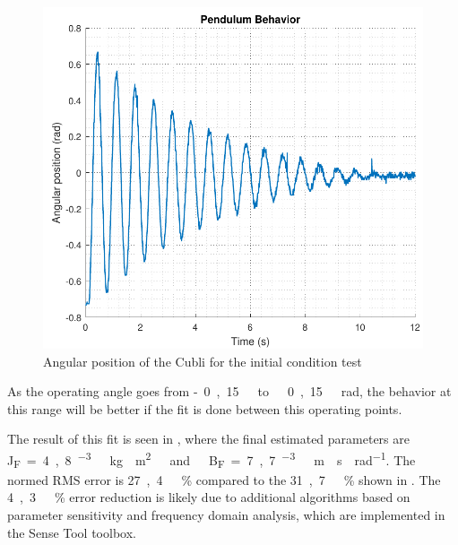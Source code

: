 \begin{figure}[H]
	\centering
	\includegraphics[scale=0.6]{figures/PendRad}
	\caption{Angular position of the Cubli for the initial condition test}
	\label{cubliInitCondTest}
\end{figure}

As the operating angle goes from \si{-0,15\ to\ 0,15\ rad}, the behavior at this range will be better if the fit is done between this operating points.

The result of this fit is seen in , where the final estimated parameters are \si{J_F=4,8 ^{-3}\ kg \cdot m^2\ and\ B_F=7,7 ^{-3}\ m \cdot s \cdot rad^{-1}}. The normed RMS error is \si{27,4\ \%} compared to the \si{31,7\ \%} shown in . The \si{4,3\ \%} error reduction is likely due to additional algorithms based on parameter sensitivity and frequency domain analysis, which are implemented in the Sense Tool toolbox.

